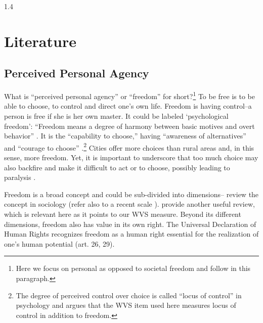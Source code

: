 \documentclass[10pt, letterpaper]{article}
\begin{document}
\begin{spacing}{1.4}
\section{Literature}
\subsection{Perceived Personal Agency %
}
 
 
What is ``perceived personal agency'' or ``freedom'' for short?\footnote{Here we focus on personal as opposed to
  societal freedom and follow \citet{aok_free_from_to} in this paragraph.} To be free is to be able to choose, to control and
direct one's own life. Freedom is having control--a person is free if she is her own master. It could be labeled `psychological freedom': ``Freedom means a degree of harmony between basic motives and overt behavior'' \citep[Bay 1970, p.83 cited in][]{aok_free_from_to}.
 It is the ``capability to choose,'' having ``awareness of alternatives'' and ``courage to choose'' \citep{veenhoven00_b}.\footnote{The degree of perceived control over choice is called ``locus of control'' in psychology and \citet{verme09} argues that the WVS item used here measures locus of control in addition to freedom.}
 Cities offer more choices than rural areas and, in this sense, more freedom. Yet, it is important to underscore that too much choice may also backfire and make it difficult to act or to choose, possibly leading to paralysis \citep{schwartz04}.

Freedom is a broad concept and could be sub-divided into dimensions--\citet{hitlin09} review the concept in sociology (refer also to a recent scale \citep{agencyScale25}). \citet{kouba16} provide another useful review, which is relevant here as it points to our WVS measure. Beyond its different dimensions, freedom also has value in its own right. The Universal Declaration of Human Rights recognizes freedom as a human right essential for the realization of one's human potential (art. 26, 29).


\end{spacing}
\end{document}
